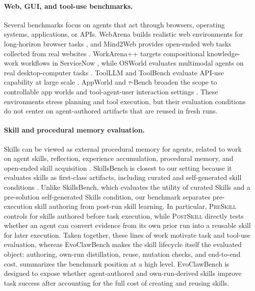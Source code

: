\documentclass[11pt]{article}
\newcommand{\ours}{EvoClawBench}
\newcommand{\preskill}{\textsc{PreSkill}}
\newcommand{\postskill}{\textsc{PostSkill}}
\begin{document}
\paragraph{Web, GUI, and tool-use benchmarks.}
Several benchmarks focus on agents that act through browsers, operating systems, applications, or APIs.
WebArena builds realistic web environments for long-horizon browser tasks \citep{zhou2023webarena}, and Mind2Web provides open-ended web tasks collected from real websites \citep{deng2023mind2web}.
WorkArena++ targets compositional knowledge-work workflows in ServiceNow \citep{boisvert2024workarena}, while OSWorld evaluates multimodal agents on real desktop-computer tasks \citep{xie2024osworld}.
ToolLLM and ToolBench evaluate API-use capability at large scale \citep{qin2023toolllm}.
AppWorld and $\tau$-Bench broaden the scope to controllable app worlds and tool-agent-user interaction settings \citep{trivedi2024appworld,yao2025taubench}.
These environments stress planning and tool execution, but their evaluation conditions do not center on agent-authored artifacts that are reused in fresh runs.

\paragraph{Skill and procedural memory evaluation.}
Skills can be viewed as external procedural memory for agents, related to work on agent skills, reflection, experience accumulation, procedural memory, and open-ended skill acquisition \citep{anthropic2025skills,yao2023react,shinn2023reflexion,zhao2023expel,fang2025memp,wang2023voyager,xu2026agentskills,wu2026agentskillsmemory}.
SkillsBench is closest to our setting because it evaluates skills as first-class artifacts, including curated and self-generated skill conditions \citep{li2026skillsbench}.
Unlike SkillsBench, which evaluates the utility of curated Skills and a pre-solution self-generated Skills condition, our benchmark separates pre-execution skill authoring from post-run skill learning.
In particular, \preskill{} controls for skills authored before task execution, while \postskill{} directly tests whether an agent can convert evidence from its own prior run into a reusable skill for later execution. Taken together, these lines of work motivate task and tool-use evaluation, whereas \ours{} makes the skill lifecycle itself the evaluated object: authoring, own-run distillation, reuse, mutation checks, and end-to-end cost.
 summarizes the benchmark position at a high level.
\ours{} is designed to expose whether agent-authored and own-run-derived skills improve task success after accounting for the full cost of creating and reusing skills.
\end{document}
